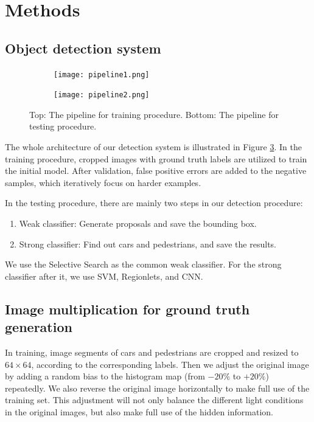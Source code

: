 \documentclass{article} %
\begin{document}
\section{Methods}

\subsection{Object detection system}


\begin{figure}[htb]
\begin{subfigure}
    \centering
    \texttt{[image: pipeline1.png]}
    \label{fig:pipeline1}
\end{subfigure}
\begin{subfigure}
    \centering
    \texttt{[image: pipeline2.png]}
    \label{fig:pipeline2}
\end{subfigure}
\caption{Top: The pipeline for training procedure. Bottom: The pipeline for testing procedure.
\label{fig:pipeline}}
\end{figure}


The whole architecture of our detection system is illustrated in Figure \ref{fig:pipeline}. In the training procedure, cropped images with ground truth labels are utilized to train the initial model. After validation, false positive errors are added to the negative samples, which iteratively focus on harder examples. 

In the testing procedure, there are mainly two steps in our detection procedure: 
\begin{enumerate}[Step 1]
    \item Weak classifier: Generate proposals and save the bounding box.
    \item Strong classifier: Find out cars and pedestrians, and save the results.
\end{enumerate}

We use the Selective Search \cite{van2011segmentation} as the common weak classifier. For the strong classifier after it, we use SVM, Regionlets, and CNN.

\subsection{Image multiplication for ground truth generation}
\label{sec:positive}

In training, image segments of cars and pedestrians are cropped and resized to $64 \times 64$, according to the corresponding labels. Then we adjust the original image by adding a random bias to the histogram map (from $-20\%$ to $+20\%$) repeatedly. We also reverse the original image horizontally to make full use of the training set. This adjustment will not only balance the different light conditions in the original images, but also make full use of the hidden information. 
\end{document}
